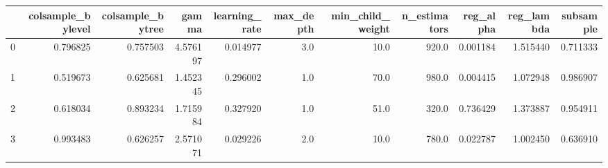 \begin{tabular}{lrrrrrrrrrr}
\toprule
{} &  colsample\_bylevel &  colsample\_bytree &     gamma &  learning\_rate &  max\_depth &  min\_child\_weight &  n\_estimators &  reg\_alpha &  reg\_lambda &  subsample \\
\midrule
0 &           0.796825 &          0.757503 &  4.576197 &       0.014977 &        3.0 &              10.0 &         920.0 &   0.001184 &    1.515440 &   0.711333 \\
1 &           0.519673 &          0.625681 &  1.452345 &       0.296002 &        1.0 &              70.0 &         980.0 &   0.004415 &    1.072948 &   0.986907 \\
2 &           0.618034 &          0.893234 &  1.715984 &       0.327920 &        1.0 &              51.0 &         320.0 &   0.736429 &    1.373887 &   0.954911 \\
3 &           0.993483 &          0.626257 &  2.571071 &       0.029226 &        2.0 &              10.0 &         780.0 &   0.022787 &    1.002450 &   0.636910 \\
\bottomrule
\end{tabular}
